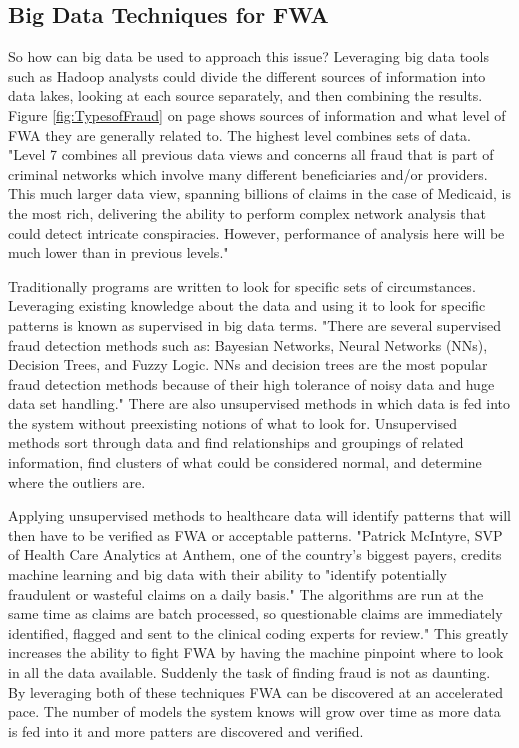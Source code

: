 \documentclass[sigconf]{acmart}
\begin{document}
\subsection{Big Data Techniques for FWA}

So how can big data be used to approach this issue?  Leveraging big data tools such as Hadoop analysts could divide the different sources of information into data lakes, looking at each source separately, and then combining the results.  Figure \ref{fig:TypesofFraud} on page \pageref{fig:TypesofFraud} shows sources of information and what level of FWA they are generally related to.  The highest level combines sets of data.  "Level 7 combines all previous data views and concerns all fraud that is part of criminal networks which involve many different beneficiaries and/or providers. This much larger data view, spanning billions of claims in the case of Medicaid, is the most rich, delivering the ability to perform complex network analysis that could detect intricate conspiracies. However, performance of analysis here will be much lower than in previous levels."\cite{THORNTON20131252} 

Traditionally programs are written to look for specific sets of circumstances.  Leveraging existing knowledge about the data and using it to look for specific patterns is known as supervised in big data terms.  "There are several supervised fraud detection methods such as: Bayesian Networks, Neural Networks (NNs), Decision Trees, and Fuzzy Logic. NNs and decision trees are the most popular fraud detection methods because of their high tolerance of noisy data and huge data set handling."  There are also unsupervised methods in which data is fed into the system without preexisting notions of what to look for\cite{Ghuse}.  Unsupervised methods sort through data and find relationships and groupings of related information, find clusters of what could be considered normal, and determine where the outliers are.  

Applying unsupervised methods to healthcare data will identify patterns that will then have to be verified as FWA or acceptable patterns.  "Patrick McIntyre, SVP of Health Care Analytics at Anthem, one of the country's biggest payers, credits machine learning and big data with their ability to "identify potentially fraudulent or wasteful claims on a daily basis." The algorithms are run at the same time as claims are batch processed, so questionable claims are immediately identified, flagged and sent to the clinical coding experts for review."\cite{Datameer}  This greatly increases the ability to fight FWA by having the machine pinpoint where to look in all the data available.  Suddenly the task of finding fraud is not as daunting.  By leveraging both of these techniques FWA can be discovered at an accelerated pace.  The number of models the system knows will grow over time as more data is fed into it and more patters are discovered and verified.
\end{document}
